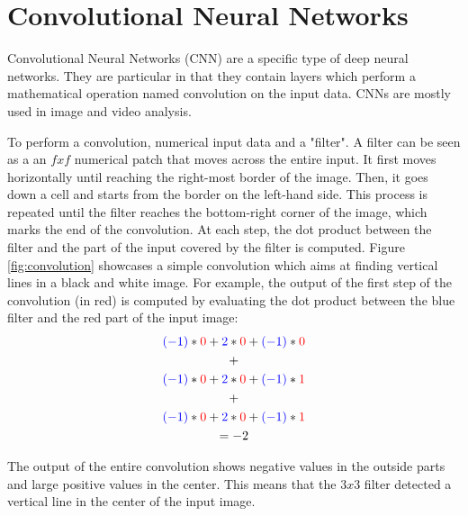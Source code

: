 \section{Convolutional Neural Networks}

Convolutional Neural Networks (CNN) are a specific type of deep neural networks. They are particular in that they contain layers which perform a mathematical operation named convolution on the input data. CNNs are mostly used in image and video analysis. 

To perform a convolution, numerical input data and a "filter". A filter can be seen as a an $fxf$ numerical patch that moves across the entire input. It first moves horizontally until reaching the right-most border of the image. Then, it goes down a cell and starts from the border on the left-hand side. This process is repeated until the filter reaches the bottom-right corner of the image, which marks the end of the convolution. At each step, the dot product between the filter and the part of the input covered by the filter is computed. Figure \ref{fig:convolution} showcases a simple convolution which aims at finding vertical lines in a black and white image. For example, the output of the first step of the convolution (in red) is computed by evaluating the dot product between the blue filter and the red part of the input image: 
\begin{equation}
\begin{gathered}
\color{blue}(-1) \color{black}* \color{red}0 \color{black}+ \color{blue}2 \color{black}* \color{red}0 \color{black}+ \color{blue}(-1) \color{black}* \color{red}0
\\ \color{black}+ \\ 
\color{blue}(-1) \color{black}* \color{red}0 \color{black}+ \color{blue}2 \color{black}* \color{red}0 \color{black}+ \color{blue}(-1) \color{black}* \color{red}1 
\\ \color{black}+ \\ 
\color{blue}(-1) \color{black}* \color{red}0 \color{black}+ \color{blue}2 \color{black}* \color{red}0 \color{black}+ \color{blue}(-1) \color{black}* \color{red}1 
\\ \color{black}= -2
\end{gathered}
\end{equation}

\noindent The output of the entire convolution shows negative values in the outside parts and large positive values in the center. This means that the $3x3$ filter detected a vertical line in the center of the input image. 

